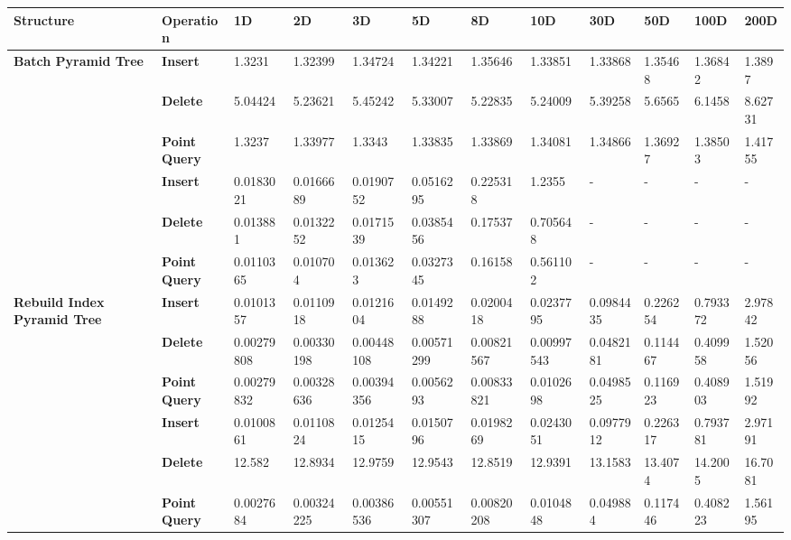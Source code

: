 \begin{landscape}

	\begin{table}
		\centering
		\begin{tabular}{|p{2cm}|l|l|l|l|l|l|l|l|l|l|l|}
			\hline
			\textbf{Structure} & \textbf{Operation} & \textbf{1D} & \textbf{2D} & \textbf{3D} & \textbf{5D} & \textbf{8D} & \textbf{10D} & \textbf{30D} & \textbf{50D} & \textbf{100D} & \textbf{200D} \\
			\hline
			\multirow{ 4}{*}{\textbf{Batch Pyramid Tree}} & \textbf{Insert} & 1.3231 & 1.32399 & 1.34724 & 1.34221 & 1.35646 & 1.33851 & 1.33868 & 1.35468 & 1.36842 & 1.3897 \\
			 & \textbf{Delete} & 5.04424 & 5.23621 & 5.45242 & 5.33007 & 5.22835 & 5.24009 & 5.39258 & 5.6565 & 6.1458 & 8.62731 \\
			 & \textbf{Point Query} & 1.3237 & 1.33977 & 1.3343 & 1.33835 & 1.33869 & 1.34081 & 1.34866 & 1.36927 & 1.38503 & 1.41755 \\
			\hline
			\multirow{ 4}{*}{\textbf{Defragmented Index Pyramid Tree}} & \textbf{Insert} & 0.0183021 & 0.0166689 & 0.0190752 & 0.0516295 & 0.225318 & 1.2355 & - & - & - & - \\
			 & \textbf{Delete} & 0.013881 & 0.0132252 & 0.0171539 & 0.0385456 & 0.17537 & 0.705648 & - & - & - & - \\
			 & \textbf{Point Query} & 0.0110365 & 0.010704 & 0.013623 & 0.0327345 & 0.16158 & 0.561102 & - & - & - & - \\
			\hline
			\multirow{ 4}{*}{\textbf{Rebuild Index Pyramid Tree}} & \textbf{Insert} & 0.0101357 & 0.0110918 & 0.0121604 & 0.0149288 & 0.0200418 & 0.0237795 & 0.0984435 & 0.226254 & 0.793372 & 2.97842 \\
			 & \textbf{Delete} & 0.00279808 & 0.00330198 & 0.00448108 & 0.00571299 & 0.00821567 & 0.00997543 & 0.0482181 & 0.114467 & 0.409958 & 1.52056 \\
			 & \textbf{Point Query} & 0.00279832 & 0.00328636 & 0.00394356 & 0.0056293 & 0.00833821 & 0.0102698 & 0.0498525 & 0.116923 & 0.408903 & 1.51992 \\
			\hline
			\multirow{ 4}{*}{\textbf{Bucket Pyramid Tree}} & \textbf{Insert} & 0.0100861 & 0.0110824 & 0.0125415 & 0.0150796 & 0.0198269 & 0.0243051 & 0.0977912 & 0.226317 & 0.793781 & 2.97191 \\
			 & \textbf{Delete} & 12.582 & 12.8934 & 12.9759 & 12.9543 & 12.8519 & 12.9391 & 13.1583 & 13.4074 & 14.2005 & 16.7081 \\
			 & \textbf{Point Query} & 0.0027684 & 0.00324225 & 0.00386536 & 0.00551307 & 0.00820208 & 0.0104848 & 0.049884 & 0.117446 & 0.408223 & 1.56195 \\

\end{tabular}
\end{table}
\end{landscape}
